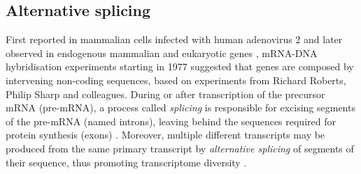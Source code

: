 
\subsection{Alternative splicing}



First reported in mammalian cells infected with human adenovirus 2 \cite{berget:1977wp,chow:1977wn} and later observed in endogenous mammalian and eukaryotic genes \cite{brack:1977we,early:1980wq}, mRNA-DNA hybridisation experiments starting in 1977 suggested that genes are composed by intervening non-coding sequences, based on experiments from Richard Roberts, Philip Sharp and colleagues. During or after transcription of the precursor mRNA (pre-mRNA), a process called \emph{splicing} is responsible for excising segments of the pre-mRNA (named introns), leaving behind the sequences required for protein synthesis (exons) \cite{berget:1977wp,chow:1977wn,gilbert:1978wr}. Moreover, multiple different transcripts may be produced from the same primary transcript by \emph{alternative splicing} of segments of their sequence, thus promoting transcriptome diversity \cite{berget:1977wp,chow:1977wn,chow:1978wk,nevins:1978tt,schmucker:2000wf}.

